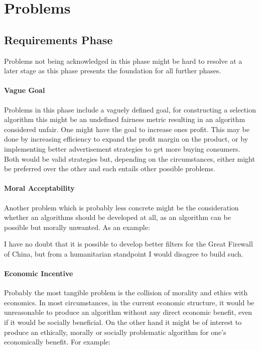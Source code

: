 \section{Problems}

\subsection{Requirements Phase}
Problems not being acknowledged in this phase might be hard to resolve at a later stage as this phase presents the foundation for all further phases. 

\paragraph{Vague Goal}
Problems in this phase include a vaguely defined goal,
for constructing a selection algorithm this might be 
an undefined fairness metric resulting in an algorithm considered unfair.
One might have the goal to increase ones profit. This may be done by increasing efficiency to expand the profit margin on the product, or by implementing better
advertisement strategies to get more buying consumers. Both would be valid strategies but, depending on the circumstances, either might be preferred over the other and each entails other possible problems.

\paragraph{Moral Acceptability}
Another problem which is probably less concrete might be the consideration whether an algorithms should be developed at all,
as an algorithm can be possible but morally unwanted.
As an example:

I have no doubt that it is possible to develop better filters for the Great Firewall of China, but from a humanitarian standpoint I would disagree to build such.

\paragraph{Economic Incentive}
Probably the most tangible problem is the collision of morality and ethics with economics. 
In most circumstances, in  the current economic structure, it would be unreasonable to produce an algorithm without any direct economic benefit, even if it would be socially beneficial. 
On the other hand it might be of interest to produce an ethically, morally or socially problematic algorithm for one's economically benefit. 
For example:

